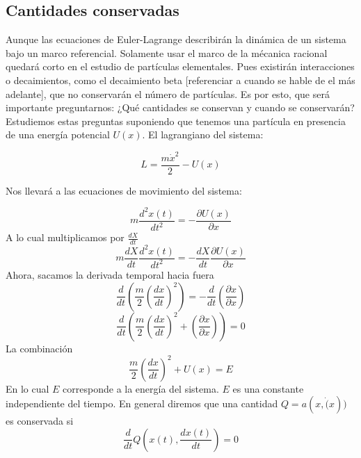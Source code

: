 \documentclass[../main.tex]{subfiles}
\begin{document}
\subsection{Cantidades conservadas}


Aunque las ecuaciones de Euler-Lagrange describirán la dinámica de un sistema bajo un marco referencial. Solamente usar el marco de la mécanica racional quedará corto en el estudio de partículas elementales. Pues existirán interacciones o decaimientos, como el decaimiento beta [referenciar a cuando se hable de el más adelante], que no conservarán el número de partículas. Es por esto, que será importante preguntarnos: ¿Qué cantidades se conservan y cuando se conservarán?\\


Estudiemos estas preguntas suponiendo que tenemos una partícula en presencia de una energía potencial $U(x)$. El lagrangiano del sistema:

\begin{equation}
    L = \frac{m\dot{x}^2}{2} - U(x)
\end{equation}

Nos llevará a las ecuaciones de movimiento del sistema: 

$$ m \frac{d^2x(t)}{dt^2}=-\frac{\partial U(x)}{\partial x }$$
A lo cual multiplicamos por $\frac{dX}{dt}$
$$ m \frac{dX}{dt}\frac{d^2x(t)}{dt^2}=-\frac{dX}{dt}\frac{\partial U(x)}{\partial x }$$
Ahora, sacamos la derivada temporal hacia fuera
$$ \frac{d}{dt} \left(  \frac{m}{2} \left( \frac{dx}{dt} \right)^2\right)= -\frac{d}{dt} \left( \frac{\partial x}{\partial x}\right)$$
$$\frac{d}{dt} \left(  \frac{m}{2} \left( \frac{dx}{dt} \right)^2+ \left( \frac{\partial x}{\partial x}\right) \right)=0 $$
La combinación
\begin{equation}
    \frac{m}{2}\left( \frac{dx}{dt}\right)^2+U(x)=E
\end{equation}
En lo cual $E$ corresponde a la energía del sistema. $E $ es una constante independiente del tiempo. 
En general diremos que una cantidad $Q=a(x,\dot(x))$ es conservada si
\begin{equation}
    \frac{d}{dt} Q\left( x(t), \frac{dx(t)}{dt}\right)=0
\end{equation}
\end{document}
